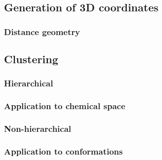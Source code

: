 \subsection{Generation of 3D coordinates}

\subsubsection{Distance geometry}

\subsection{Clustering}

\subsubsection{Hierarchical}

\subsubsection{Application to chemical space}

\subsubsection{Non-hierarchical}

\subsubsection{Application to conformations}